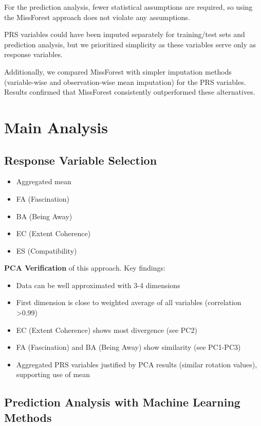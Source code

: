 \documentclass[
  letterpaper,
  DIV=11,
  numbers=noendperiod]{scrartcl}
\providecommand{\tightlist}{%
  \setlength{\itemsep}{0pt}\setlength{\parskip}{0pt}}
\begin{document}
For the prediction analysis, fewer statistical assumptions are required,
so using the MissForest approach does not violate any assumptions.

PRS variables could have been imputed separately for training/test sets
and prediction analysis, but we prioritized simplicity as these
variables serve only as response variables.

Additionally, we compared MissForest with simpler imputation methods
(variable-wise and observation-wise mean imputation) for the PRS
variables. Results confirmed that MissForest consistently outperformed
these alternatives.

\section{Main Analysis}\label{main-analysis}

\subsection{Response Variable
Selection}\label{response-variable-selection}

\begin{itemize}
\tightlist
\item
  Aggregated mean
\item
  FA (Fascination)
\item
  BA (Being Away)
\item
  EC (Extent Coherence)
\item
  ES (Compatibility)
\end{itemize}

\textbf{PCA Verification} of this approach. Key findings:

\begin{itemize}
\tightlist
\item
  Data can be well approximated with 3-4 dimensions
\item
  First dimension is close to weighted average of all variables
  (correlation \textgreater0.99)
\item
  EC (Extent Coherence) shows most divergence (see PC2)
\item
  FA (Fascination) and BA (Being Away) show similarity (see PC1-PC3)
\item
  Aggregated PRS variables justified by PCA results (similar rotation
  values), supporting use of mean
\end{itemize}

\subsection{Prediction Analysis with Machine Learning
Methods}\label{prediction-analysis-with-machine-learning-methods}
\end{document}
